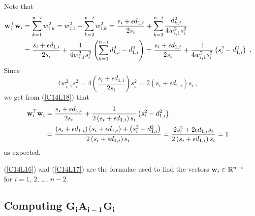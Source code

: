 Note that
\begin{align}
\VEC{w}_i^\top\VEC{w}_i &= \sum_{k=1}^{n-i} w_{i,k}^2
= w_{i,1}^2 + \sum_{k=2}^{n-i} w_{i,k}^2
= \frac{s_i + \epsilon d_{1,i}}{2s_i} + \sum_{k=2}^{n-i}
\frac{d_{k,i}^2}{4 w_{i,1}^2 s_i^2} \nonumber \\
&= \frac{s_i + \epsilon d_{1,i}}{2s_i} +
\frac{1}{4 w_{i,1}^2 s_i^2}\left(\sum_{k=1}^{n-i} d_{k,i}^2
- d_{1,i}^2\right)
= \frac{s_i + \epsilon d_{1,i}}{2s_i} +
\frac{1}{4 w_{i,1}^2 s_i^2}\left(s_i^2- d_{1,i}^2\right) \ .  \label{C14L18}
\end{align}
Since
\[
4 w_{i,1}^2 s_i^2 = 4 \left(\frac{s_i + \epsilon d_{1,i}}{2s_i}\right)
s_i^2 = 2\left( s_i + \epsilon d_{1,i}\right)s_i \ ,
\]
we get from (\ref{C14L18}) that
\begin{align*}
\mathbf{w}_i^\top\mathbf{w}_i &= \frac{s_i + \epsilon d_{1,i}}{2s_i}
+ \frac{1}{2\left( s_i + \epsilon d_{1,i}\right)s_i}
\left(s_i^2- d_{1,i}^2\right) \\
&= \frac{\left(s_i + \epsilon d_{1,i}\right)
\left( s_i + \epsilon d_{1,i}\right) + \left(s_i^2- d_{1,i}^2\right)}
{2\left( s_i + \epsilon d_{1,i}\right)s_i}
= \frac{2 s_i^2 + 2 \epsilon d_{1,i} s_i}
{2\left( s_i + \epsilon d_{1,i}\right)s_i} = 1
\end{align*}
as expected.

(\ref{C14L16}) and (\ref{C14L17}) are the formulae used to find
the vectors $\mathbf{w}_i \in \mathbb{R}^{n-i}$ for $i=1$, $2$, \ldots, $n-2$.

\subsection{Computing $\mathbf{G_i A_{i-1} G_i}$}

